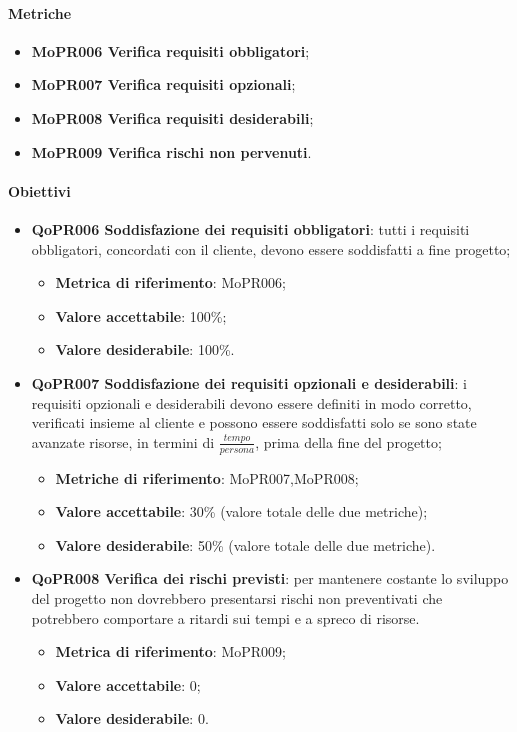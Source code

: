 \documentclass[../piano-di-qualifica.tex]{subfiles}
\begin{document}
\paragraph{Metriche}
\label{sub:metriche_2}
\begin{itemize}
    \item \textbf{MoPR006 Verifica requisiti obbligatori};
    \item \textbf{MoPR007 Verifica requisiti opzionali};
    \item \textbf{MoPR008 Verifica requisiti desiderabili};
    \item \textbf{MoPR009 Verifica rischi non pervenuti}.
\end{itemize}

\paragraph{Obiettivi}
\label{sub:obiettivi_2}
\begin{itemize}
    \item \textbf{QoPR006 Soddisfazione dei requisiti obbligatori}: tutti i requisiti obbligatori, concordati con il cliente, devono essere soddisfatti a fine progetto;
        \begin{itemize}
            \item \textbf{Metrica di riferimento}: MoPR006;
            \item \textbf{Valore accettabile}: 100\%; %
            \item \textbf{Valore desiderabile}: 100\%.
        \end{itemize}
    \item \textbf{QoPR007 Soddisfazione dei requisiti opzionali e desiderabili}: i requisiti opzionali e desiderabili devono essere definiti in modo corretto, verificati insieme al cliente e possono essere soddisfatti solo se sono state avanzate risorse, in termini di $\frac{tempo}{persona}$, prima della fine del progetto;
        \begin{itemize}
            \item \textbf{Metriche di riferimento}: MoPR007,MoPR008;
            \item \textbf{Valore accettabile}: 30\% (valore totale delle due metriche); %
            \item \textbf{Valore desiderabile}: 50\% (valore totale delle due metriche).
        \end{itemize}
    \item \textbf{QoPR008 Verifica dei rischi previsti}: per mantenere costante lo sviluppo del progetto non dovrebbero presentarsi rischi non preventivati che potrebbero comportare a ritardi sui tempi e a spreco di risorse.
        \begin{itemize}
            \item \textbf{Metrica di riferimento}: MoPR009;
            \item \textbf{Valore accettabile}: 0; %
            \item \textbf{Valore desiderabile}: 0.
        \end{itemize}
\end{itemize}
\end{document}
